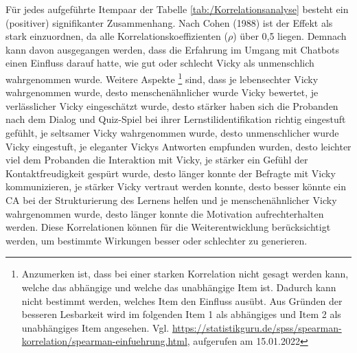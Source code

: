 Für jedes aufgeführte Itempaar der Tabelle \ref{tab:/Korrelationsanalyse} besteht ein (positiver) signifikanter Zusammenhang.
Nach Cohen (1988) ist der Effekt als stark einzuordnen, da alle Korrelationskoeffizienten ($\rho$) über 0,5 liegen. \parencite[80]{Cohen.1988}
Demnach kann davon ausgegangen werden, dass die Erfahrung im Umgang mit Chatbots einen Einfluss darauf hatte, wie gut oder schlecht 
Vicky als unmenschlich wahrgenommen wurde.
Weitere Aspekte \footnote{Anzumerken ist, dass bei einer starken Korrelation nicht gesagt werden kann, welche das abhängige und 
welche das unabhängige Item ist. Dadurch kann nicht bestimmt werden, welches Item den Einfluss ausübt. Aus Gründen der besseren Lesbarkeit wird im 
folgenden Item 1 als abhängiges und Item 2 als unabhängiges Item angesehen. Vgl. \url{https://statistikguru.de/spss/spearman-korrelation/spearman-einfuehrung.html}, aufgerufen am 15.01.2022} 
sind, dass je lebensechter Vicky wahrgenommen wurde, desto menschenähnlicher wurde Vicky bewertet,
je verlässlicher Vicky eingeschätzt wurde, desto stärker haben sich die Probanden nach dem Dialog und Quiz-Spiel bei ihrer Lernstilidentifikation richtig eingestuft gefühlt, 
je seltsamer Vicky wahrgenommen wurde, desto unmenschlicher wurde Vicky eingestuft, je eleganter 
Vickys Antworten empfunden wurden, desto leichter viel dem Probanden die Interaktion mit Vicky, je stärker ein Gefühl 
der Kontaktfreudigkeit gespürt wurde, desto länger konnte der Befragte mit Vicky kommunizieren, 
je stärker Vicky vertraut werden konnte, desto besser könnte ein CA bei der Strukturierung des Lernens helfen und 
je menschenähnlicher Vicky wahrgenommen wurde, desto länger konnte die Motivation aufrechterhalten werden.
Diese Korrelationen können für die Weiterentwicklung berücksichtigt werden, um bestimmte Wirkungen besser oder schlechter zu generieren.

